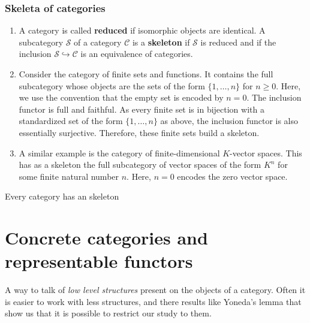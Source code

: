 \subsubsection*{Skeleta of categories}
\begin{example}
    
    \begin{enumerate}
        \item A category is called \textbf{reduced} if isomorphic objects are identical. A subcategory $\mathcal{S}$ of a category $\mathcal{C}$ is a \textbf{skeleton} if $\mathcal{S}$ is reduced and if the inclusion $\mathcal{S} \hookrightarrow \mathcal{C}$ is an equivalence of categories.
        
        \item Consider the category of finite sets and functions. It contains the full subcategory whose objects are the sets of the form $\{1, \ldots, n\}$ for $n \geq 0$. Here, we use the convention that the empty set is encoded by $n=0$. The inclusion functor is full and faithful. As every finite set is in bijection with a standardized set of the form $\{1, \ldots, n\}$ as above, the inclusion functor is also essentially surjective. Therefore, these finite sets build a skeleton.
        
        \item A similar example is the category of finite-dimensional $K$-vector spaces. This has as a skeleton the full subcategory of vector spaces of the form $K^n$ for some finite natural number $n$. Here, $n=0$ encodes the zero vector space.
    \end{enumerate}
\end{example}


\begin{prop}
    Every category has an skeleton
\end{prop}





\section{Concrete categories and representable functors}

A way to talk of \textit{low level structures} present on the objects of a category. Often it is easier to work with less structures, and there results like Yoneda's lemma that show us that it is possible to restrict our study to them.\\

